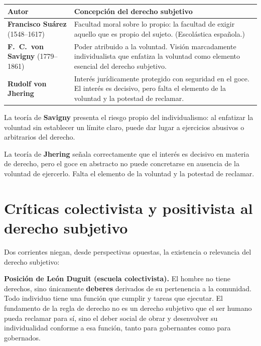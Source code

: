 \documentclass[12pt, a4paper]{report}
\begin{document}
\vspace{6pt}
\begin{center}
\begin{tabular}{L{3.5cm} L{10cm}}
\toprule
\textbf{Autor} & \textbf{Concepción del derecho subjetivo} \\
\midrule
\textbf{Francisco Suárez} \newline (1548--1617) &
  Facultad moral sobre lo propio: la facultad de exigir aquello que es propio
  del sujeto. (Escolástica española.) \\
\addlinespace
\textbf{F.~C.~von Savigny} \newline (1779--1861) &
  Poder atribuido a la voluntad. Visión marcadamente individualista que
  enfatiza la voluntad como elemento esencial del derecho subjetivo. \\
\addlinespace
\textbf{Rudolf von Jhering} &
  Interés jurídicamente protegido con seguridad en el goce. El interés es
  decisivo, pero falta el elemento de la voluntad y la potestad de reclamar. \\
\bottomrule
\end{tabular}
\end{center}
\vspace{6pt}

\begin{important}
La teoría de \textbf{Savigny} presenta el riesgo propio del individualismo:
al enfatizar la voluntad sin establecer un límite claro, puede dar lugar a
ejercicios abusivos o arbitrarios del derecho.

La teoría de \textbf{Jhering} señala correctamente que el interés es decisivo
en materia de derecho, pero el goce en abstracto no puede concretarse en
ausencia de la voluntad de ejercerlo. Falta el elemento de la voluntad y la
potestad de reclamar.
\end{important}

\section{Críticas colectivista y positivista al derecho subjetivo}

Dos corrientes niegan, desde perspectivas opuestas, la existencia o relevancia
del derecho subjetivo:

\begin{definition}
\textbf{Posición de León Duguit (escuela colectivista).} El hombre no tiene
derechos, sino únicamente \textbf{deberes} derivados de su pertenencia a la
comunidad. Todo individuo tiene una función que cumplir y tareas que ejecutar.
El fundamento de la regla de derecho no es un derecho subjetivo que el ser
humano pueda reclamar para sí, sino el deber social de obrar y desenvolver su
individualidad conforme a esa función, tanto para gobernantes como para
gobernados.
\end{definition}
\end{document}
